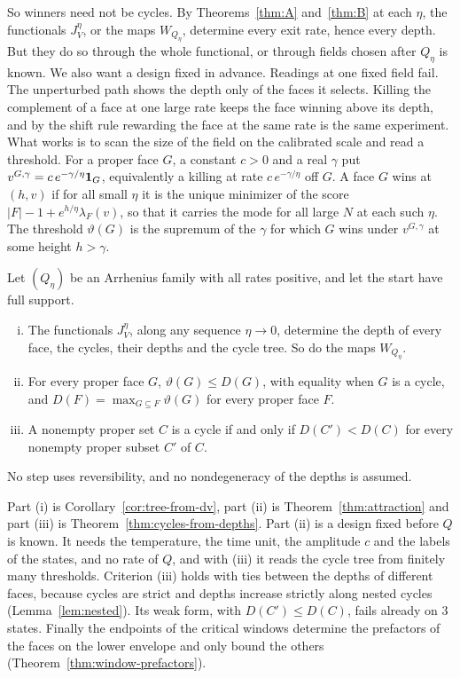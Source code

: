 So winners need not be cycles. By Theorems~\ref{thm:A} and~\ref{thm:B} at each $\eta$, the
functionals $J^\eta_V$, or the maps $W_{Q_\eta}$, determine every exit rate, hence every depth.
But they do so through the whole functional, or through fields chosen after $Q_\eta$ is known. We
also want a design fixed in advance. Readings at one fixed field fail. The unperturbed path shows
the depth only of the faces it selects. Killing the complement of a face at one large rate keeps
the face winning above its depth, and by the shift rule rewarding the face at the same rate is
the same experiment. What works is to scan the size of the field on the calibrated scale and read
a threshold. For a proper face $G$, a constant $c>0$ and a real $\gamma$ put
$v^{G,\gamma}=c\,e^{-\gamma/\eta}\mathbf{1}_G$, equivalently a killing at rate $c\,e^{-\gamma/\eta}$ off
$G$. A face $G$ wins at $(h,v)$ if for all small $\eta$ it is the unique minimizer of the score
$|F|-1+e^{h/\eta}\lambda_F(v)$, so that it carries the mode for all large $N$ at each such $\eta$.
The threshold $\vartheta(G)$ is the supremum of the $\gamma$ for which $G$ wins under
$v^{G,\gamma}$ at some height $h>\gamma$.

\begin{introtheorem}\label{thm:D}
Let $(Q_\eta)$ be an Arrhenius family with all rates positive, and let the start have full support.
\begin{enumerate}[(i)]
\item The functionals $J^\eta_V$, along any sequence $\eta\to0$, determine the depth of every face,
the cycles, their depths and the cycle tree. So do the maps $W_{Q_\eta}$.
\item For every proper face $G$, $\vartheta(G)\le D(G)$, with equality when $G$ is a cycle, and
$D(F)=\max_{G\subseteq F}\vartheta(G)$ for every proper face $F$.
\item A nonempty proper set $C$ is a cycle if and only if $D(C')<D(C)$ for every nonempty proper
subset $C'$ of $C$.
\end{enumerate}
No step uses reversibility, and no nondegeneracy of the depths is assumed.
\end{introtheorem}

Part (i) is Corollary~\ref{cor:tree-from-dv}, part (ii) is Theorem~\ref{thm:attraction} and
part (iii) is Theorem~\ref{thm:cycles-from-depths}. Part (ii) is a design fixed before $Q$ is
known. It needs the temperature, the time unit, the amplitude $c$ and the labels of the states,
and no rate of $Q$, and with (iii) it reads the cycle tree from finitely many thresholds. Criterion
(iii) holds with ties between the depths of different faces, because cycles are strict and depths
increase strictly along nested cycles (Lemma~\ref{lem:nested}). Its weak form, with
$D(C')\le D(C)$, fails already on 3 states. Finally the endpoints of the critical windows
determine the prefactors of the faces on the lower envelope and only bound the others
(Theorem~\ref{thm:window-prefactors}).

